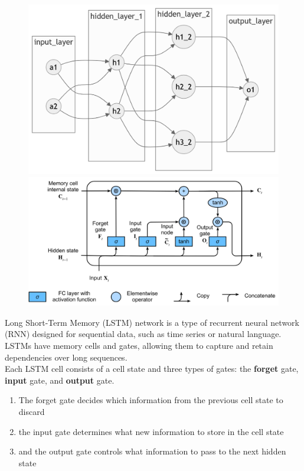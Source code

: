 \documentclass[letterpaper,11pt]{article}
\begin{document}
\begin{figure}[H]
    \centering
    \begin{minipage}[b]{0.40\textwidth}
      \centering
      \includegraphics[width=\linewidth]{img/ffnn_exemple.png} 
    \end{minipage}
    \hfill
    \begin{minipage}[b]{0.49\textwidth}
      \centering
      \includegraphics[width=\linewidth]{img/lstm.png}
    \end{minipage}
  \end{figure}


  Long Short-Term Memory (LSTM) network is a type of recurrent neural network (RNN) designed for sequential data, such as time series or natural language. LSTMs have memory cells and gates, allowing them to capture and retain dependencies over long sequences.\\

 Each LSTM cell consists of a cell state and three types of gates: the \textbf{forget} gate, \textbf{input} gate, and \textbf{output} gate.
 \begin{enumerate}
    \item The forget gate decides which information from the previous cell state to discard
    \item the input gate determines what new information to store in the cell state
    \item and the output gate controls what information to pass to the next hidden state
 \end{enumerate}
\end{document}

